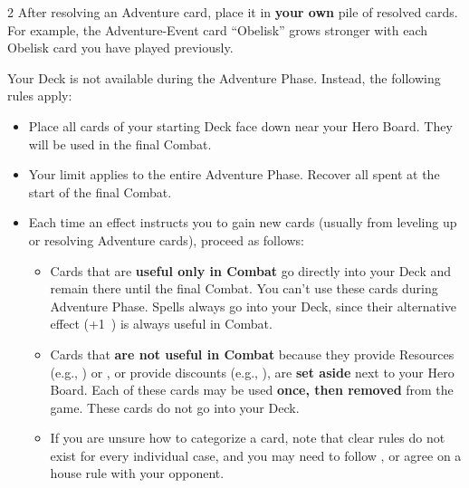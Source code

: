 \begin{expansion}
\begin{multicols}{2}
  After resolving an Adventure card, place it in \textbf{your own} pile of resolved cards.
  For example, the Adventure-Event card ``Obelisk'' grows stronger with each Obelisk card you have played previously.\par

  Your Deck is not available during the Adventure Phase.
  Instead, the following rules apply:
  \begin{itemize}
    \item Place all cards of your starting Deck face down near your Hero Board.
      They will be used in the final Combat.
    \item Your  limit applies to the entire Adventure Phase.
      Recover all spent  at the start of the final Combat.
    \item Each time an effect instructs you to gain new cards (usually from leveling up or resolving Adventure cards), proceed as follows:
    \begin{itemize}
      \item Cards that are \textbf{useful only in Combat} go directly into your Deck and remain there until the final Combat.
        You can't use these cards during Adventure Phase.
        Spells always go into your Deck, since their alternative effect (+1~) is always useful in Combat.
      \item Cards that \textbf{are not useful in Combat} because they provide Resources (e.g., ) or , or provide discounts (e.g.,  ), are \textbf{set aside} next to your Hero Board.
        Each of these cards may be used \textbf{once, then removed} from the game.
        These cards do not go into your Deck.
      \item If you are unsure how to categorize a card, note that clear rules do not exist for every individual case, and you may need to follow , or agree on a house rule with your opponent.
    \end{itemize}
  \end{itemize}
  \end{multicols}
\end{expansion}

